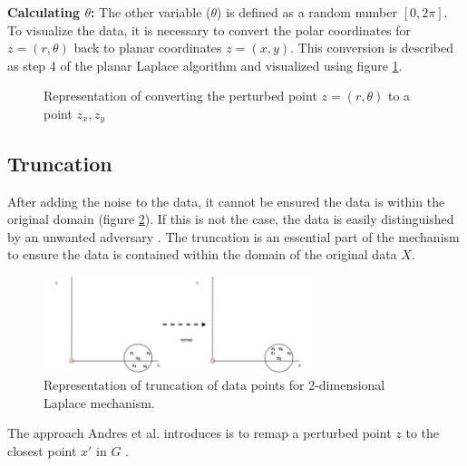 \textbf{Calculating $\theta$:}
The other variable ($\theta$) is defined as a random number $[0, 2\pi]$. \newline
To visualize the data, it is necessary to convert the polar coordinates for $z = (r, \theta)$ back to planar coordinates $z = (x, y)$.
This conversion is described as step 4 of the planar Laplace algorithm \citep{DBLP:journals/corr/abs-1212-1984} and visualized using figure \ref{figure:geo}.
\begin{figure}[h]
  
  \centering
  \caption{Representation of converting the perturbed point $z = (r, \theta)$ to a point ${z_x, z_y}$}
  \label{figure:geo}
\end{figure}

\newpage
\subsection{Truncation} \label{theory:truncation}
After adding the noise to the data, it cannot be ensured the data is within the original domain (figure \ref{figure:truncation-2d}).
If this is not the case, the data is easily distinguished by an unwanted adversary \citep{DBLP:journals/corr/abs-1212-1984,9646489}.
The truncation is an essential part of the mechanism to ensure the data is contained within the domain of the original data $X$.
\begin{figure}[H]
  \includegraphics[width=0.7\textwidth]{TheorethicalFramework/ND-Laplace/Images/remapping.png}
  \caption{Representation of truncation of data points for 2-dimensional Laplace mechanism.}
  \label{figure:truncation-2d}
\end{figure}
The approach Andres et al. introduces is to remap a perturbed point $z$ to the closest point $x'$ in $G$ \citep{DBLP:journals/corr/abs-1212-1984}.
